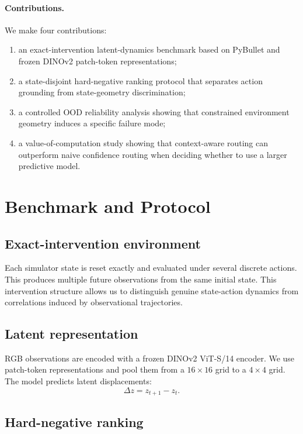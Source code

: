 \documentclass[10pt]{article}
\begin{document}
\paragraph{Contributions.}
We make four contributions:
\begin{enumerate}
    \item an exact-intervention latent-dynamics benchmark based on PyBullet and frozen DINOv2 patch-token representations;
    \item a state-disjoint hard-negative ranking protocol that separates action grounding from state-geometry discrimination;
    \item a controlled OOD reliability analysis showing that constrained environment geometry induces a specific failure mode;
    \item a value-of-computation study showing that context-aware routing can outperform naive confidence routing when deciding whether to use a larger predictive model.
\end{enumerate}

\section{Benchmark and Protocol}

\subsection{Exact-intervention environment}

Each simulator state is reset exactly and evaluated under several discrete actions.
This produces multiple future observations from the same initial state.
This intervention structure allows us to distinguish genuine state-action dynamics from correlations induced by observational trajectories.

\subsection{Latent representation}

RGB observations are encoded with a frozen DINOv2 ViT-S/14 encoder.
We use patch-token representations and pool them from a $16 \times 16$ grid to a $4 \times 4$ grid.
The model predicts latent displacements:
\[
\Delta z = z_{t+1} - z_t.
\]

\subsection{Hard-negative ranking}
\end{document}
